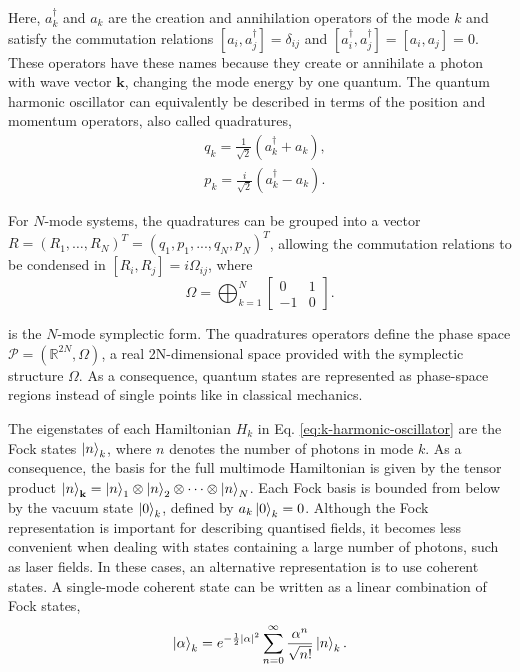 \noindent Here, ${a}_k^\dagger$ and ${a}_k$ are the creation and annihilation operators of the mode $k$ and satisfy the commutation relations $[{a}_i, {a}_j^\dagger] = \delta_{ij}$ and $[{a}_i^\dagger, {a}_j^\dagger] = [{a}_i, {a}_j] = 0$. These operators have these names because they create or annihilate a photon with wave vector $\mathbf{k}$, changing the mode energy by one quantum. The quantum harmonic oscillator can equivalently be described in terms of the position and momentum operators, also called quadratures,
\begin{align}
    &{q}_k = \frac{1}{\sqrt{2}} ({a}_k^\dagger + {a}_k),
    \label{eq:q-quadrature}\\
    &{p}_k = \frac{i}{\sqrt{2}} ({a}_k^\dagger - {a}_k).
    \label{eq:p-quadrature}
\end{align}

\noindent For $N$-mode systems, the quadratures can be grouped into a vector ${R} = ({R}_1, \dots, {R}_N)^T = ({q}_1, {p}_1, ..., {q}_N, {p}_N)^T$, allowing the commutation relations to be condensed in $[{R}_i, {R}_j] = i \Omega_{ij}$, where
\begin{equation}
    \Omega = \bigoplus_{k = 1}^{N}
    \begin{bmatrix}
        0 & 1\\
        -1 & 0
    \end{bmatrix}.
\end{equation}

\noindent is the $N$-mode symplectic form. The quadratures operators define the phase space $\mathcal{P} = (\mathbb{R}^{2N} , \Omega)$, a real 2N-dimensional space provided with the symplectic structure $\Omega$. As a consequence, quantum states are represented as phase-space regions instead of single points like in classical mechanics.

The eigenstates of each Hamiltonian $H_k$ in Eq. \eqref{eq:k-harmonic-oscillator} are the Fock states $\ket{n}_k$, where $n$ denotes the number of photons in mode $k$. As a consequence, the basis for the full multimode Hamiltonian is given by the tensor product $\ket{n}_\mathbf{k} = \ket{n}_1 \otimes \ket{n}_2 \otimes \dots \otimes \ket{n}_N$. Each Fock basis is bounded from below by the vacuum state $\ket{0}_k$, defined by ${a}_k \ket{0}_k = 0$. Although the Fock representation is important for describing quantised fields, it becomes less convenient when dealing with states containing a large number of photons, such as laser fields. In these cases, an alternative representation is to use coherent states. A single-mode coherent state can be written as a linear combination of Fock states,
\begin{equation}
    \ket{\alpha}_k = e^{-\frac{1}{2}|\alpha|^2} \sum_{n=0}^{\infty} \frac{\alpha^n}{\sqrt{n!}} \ket{n}_k.
\end{equation}

